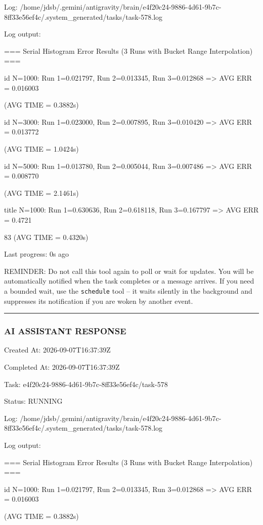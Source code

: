 \documentclass[11pt,a4paper]{article}
\begin{document}
Log: /home/jdsb/.gemini/antigravity/brain/e4f20c24-9886-4d61-9b7c-8ff33e56ef4c/.system\_generated/tasks/task-578.log

Log output:

=== Serial Histogram Error Results (3 Runs with Bucket Range Interpolation) ===

id N=1000: Run 1=0.021797, Run 2=0.013345, Run 3=0.012868 => AVG ERR = 0.016003

(AVG TIME = 0.3882s)

id N=3000: Run 1=0.023000, Run 2=0.007895, Run 3=0.010420 => AVG ERR = 0.013772

(AVG TIME = 1.0424s)

id N=5000: Run 1=0.013780, Run 2=0.005044, Run 3=0.007486 => AVG ERR = 0.008770

(AVG TIME = 2.1461s)

title N=1000: Run 1=0.630636, Run 2=0.618118, Run 3=0.167797 => AVG ERR = 0.4721

83 (AVG TIME = 0.4320s)


Last progress: 0s ago



REMINDER: Do not call this tool again to poll or wait for updates. You will be automatically notified when the task completes or a message arrives. If you need a bounded wait, use the \texttt{schedule} tool -- it waits silently in the background and suppresses its notification if you are woken by another event.


\hrule

\subsubsection{AI ASSISTANT RESPONSE}

Created At: 2026-09-07T16:37:39Z

Completed At: 2026-09-07T16:37:39Z

Task: e4f20c24-9886-4d61-9b7c-8ff33e56ef4c/task-578

Status: RUNNING

Log: /home/jdsb/.gemini/antigravity/brain/e4f20c24-9886-4d61-9b7c-8ff33e56ef4c/.system\_generated/tasks/task-578.log

Log output:

=== Serial Histogram Error Results (3 Runs with Bucket Range Interpolation) ===

id N=1000: Run 1=0.021797, Run 2=0.013345, Run 3=0.012868 => AVG ERR = 0.016003

(AVG TIME = 0.3882s)
\end{document}
